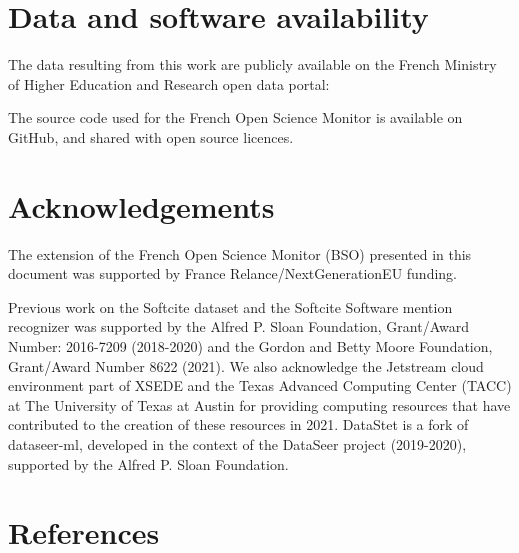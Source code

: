 \documentclass[
]{article}
\begin{document}
\hypertarget{data-and-software-availability}{%
\section{Data and software
availability}\label{data-and-software-availability}}

The data resulting from this work are publicly available on the French
Ministry of Higher Education and Research open data portal:

The source code used for the French Open Science Monitor is available on
GitHub, and shared with open source licences.

\hypertarget{acknowledgements}{%
\section{Acknowledgements}\label{acknowledgements}}

The extension of the French Open Science Monitor (BSO) presented in this
document was supported by France Relance/NextGenerationEU funding.

Previous work on the Softcite dataset and the Softcite Software mention
recognizer was supported by the Alfred P. Sloan Foundation, Grant/Award
Number: 2016-7209 (2018-2020) and the Gordon and Betty Moore Foundation,
Grant/Award Number 8622 (2021). We also acknowledge the Jetstream cloud
environment part of XSEDE and the Texas Advanced Computing Center (TACC)
at The University of Texas at Austin for providing computing resources
that have contributed to the creation of these resources in 2021.
DataStet is a fork of dataseer-ml, developed in the context of the
DataSeer project (2019-2020), supported by the Alfred P. Sloan
Foundation.

\hypertarget{references}{%
\section*{References}\label{references}}
\end{document}
